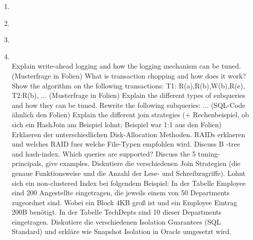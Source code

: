 \documentclass[12pt]{article}\pagestyle{myheadings}
\theoremstyle{plain}
\begin{document}
\begin{enumerate}
\item \textbf{} \\
\item \textbf{} \\
\item \textbf{} \\
\item \textbf{} \\
Explain write-ahead logging and how the logging mechanism can be tuned. (Musterfrage in Folien)
What is transaction chopping and how does it work? Show the algorithm on the following transactions: T1:
R(a),R(b),W(b),R(e), T2:R(b), ... (Musterfrage in Folien)
Explain the different types of subqueries and how they can be tuned. Rewrite the following subqueries: ...
(SQL-Code ähnlich den Folien)
Explain the different join strategies (+ Rechenbeispiel, ob sich ein HashJoin am Beispiel lohnt; Beispiel war
1:1 aus den Folien)
Erklaeren der unterschiedlichen Disk-Allocation Methoden. RAIDs erklaeren und welches RAID fuer welche
File-Typen empfohlen wird.
Discuss B -tree and hash-index. Which queries are supported?
Discuss the 5 tuning-principals, give examples.
Diskutiere die verschiedenen Join Strategien (die genaue Funktionsweise und die Anzahl der Lese- und
Schreibzugriffe). Lohnt sich ein non-clustered Index bei folgendem Beispiel: In der Tabelle Employee sind 200
Angestellte eingetragen, die jeweils einem von 50 Departments zugeordnet sind. Wobei ein Block 4KB groß ist
und ein Employee Eintrag 200B benötigt. In der Tabelle TechDepts sind 10 dieser Departments eingetragen.
Diskutiere die verschiedenen Isolation Guarantees (SQL Standard) und erkläre wie Snapshot Isolation in
Oracle umgesetzt wird.




\end{enumerate}
\end{document}

